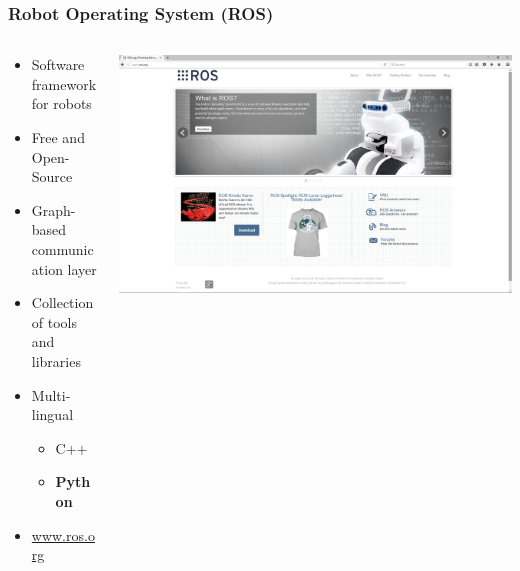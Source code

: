 \documentclass[aspectratio=169]{beamer}
\begin{document}
  \begin{frame}
   \frametitle{Robot Operating System (ROS)}
   \begin{columns}[onlytextwidth]
    \begin{column}{0.5\textwidth}
    
      \begin{itemize}
       \item Software framework for robots 
       \item Free and Open-Source 
       \item Graph-based communication layer 
       \item Collection of tools and libraries 
       \item Multi-lingual 
       \begin{itemize}
	\item C++
	\item \textbf{Python} 
       \end{itemize}
       \cite{Quigley2009}
       \item \url{www.ros.org}
      \end{itemize}
    
    \end{column}
    \begin{column}{0.5\textwidth}

    \includegraphics[width=1.5\textwidth]{./Abbildungen/ros_screenshot.png}
    
    \end{column}
   \end{columns}
  \end{frame}
\end{document}
